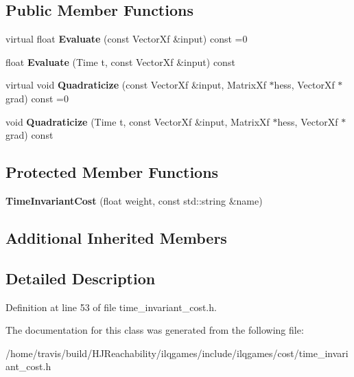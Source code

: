\subsection*{Public Member Functions}
\begin{DoxyCompactItemize}
\item 
virtual float {\bfseries Evaluate} (const Vector\+Xf \&input) const =0\hypertarget{classilqgames_1_1_time_invariant_cost_a61c214ac9833c3f42b51167bdec1cbc7}{}\label{classilqgames_1_1_time_invariant_cost_a61c214ac9833c3f42b51167bdec1cbc7}

\item 
float {\bfseries Evaluate} (Time t, const Vector\+Xf \&input) const \hypertarget{classilqgames_1_1_time_invariant_cost_a1e59c75a8765e4d89243c20838cc2bed}{}\label{classilqgames_1_1_time_invariant_cost_a1e59c75a8765e4d89243c20838cc2bed}

\item 
virtual void {\bfseries Quadraticize} (const Vector\+Xf \&input, Matrix\+Xf $\ast$hess, Vector\+Xf $\ast$grad) const =0\hypertarget{classilqgames_1_1_time_invariant_cost_abe3173385a2f31fa556c1553075eb18f}{}\label{classilqgames_1_1_time_invariant_cost_abe3173385a2f31fa556c1553075eb18f}

\item 
void {\bfseries Quadraticize} (Time t, const Vector\+Xf \&input, Matrix\+Xf $\ast$hess, Vector\+Xf $\ast$grad) const \hypertarget{classilqgames_1_1_time_invariant_cost_a185aa5080bcdaa68804810d1a046ebcd}{}\label{classilqgames_1_1_time_invariant_cost_a185aa5080bcdaa68804810d1a046ebcd}

\end{DoxyCompactItemize}
\subsection*{Protected Member Functions}
\begin{DoxyCompactItemize}
\item 
{\bfseries Time\+Invariant\+Cost} (float weight, const std\+::string \&name)\hypertarget{classilqgames_1_1_time_invariant_cost_a284519a634c47b5954f64349db1ede2e}{}\label{classilqgames_1_1_time_invariant_cost_a284519a634c47b5954f64349db1ede2e}

\end{DoxyCompactItemize}
\subsection*{Additional Inherited Members}


\subsection{Detailed Description}


Definition at line 53 of file time\+\_\+invariant\+\_\+cost.\+h.



The documentation for this class was generated from the following file\+:\begin{DoxyCompactItemize}
\item 
/home/travis/build/\+H\+J\+Reachability/ilqgames/include/ilqgames/cost/time\+\_\+invariant\+\_\+cost.\+h\end{DoxyCompactItemize}
